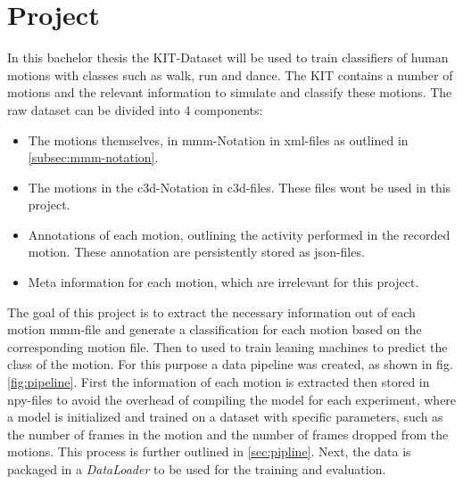 \chapter{Project}
	In this bachelor thesis the KIT-Dataset\cite{Plappert2016} will be used to train classifiers of human motions with classes such as walk, run and dance. The KIT contains a number of motions and the relevant information to simulate and classify these motions. The raw dataset can be divided into 4 components:
	\begin{itemize}
		\item The motions themselves, in mmm-Notation in xml-files as outlined in \ref{subsec:mmm-notation}.
		\item The motions in the c3d-Notation in c3d-files. These files wont be used in this project.
		\item Annotations of each motion, outlining the activity performed in the recorded motion. These annotation are persistently stored as json-files.
		\item Meta information for each motion, which are irrelevant for this project.
	\end{itemize}
	The goal of this project is to extract the necessary information out of each motion mmm-file and generate a classification for each motion based on the corresponding motion file. Then to used to train leaning machines to predict the class of the motion. For this purpose a data pipeline was created, as shown in fig. \ref{fig:pipeline}. First the information of each motion is extracted then stored in npy-files to avoid the overhead of compiling the model for each experiment, where a model is initialized and trained on a dataset with specific parameters, such as the number of frames in the motion and the number of frames dropped from the motions. This process is further outlined in \ref{sec:pipline}. Next, the data is packaged in a \textit{DataLoader} to be used for the training and evaluation.
